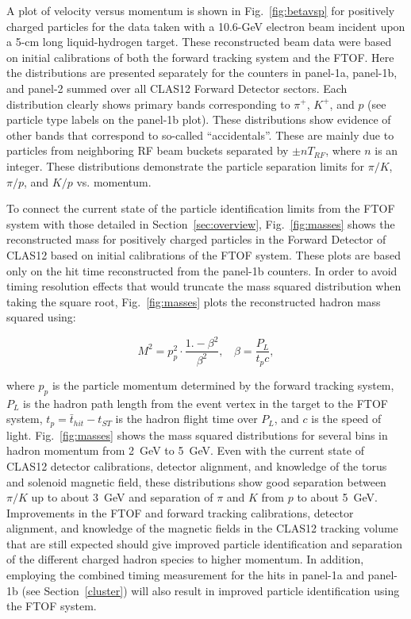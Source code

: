 \documentclass[3p,times,twocolumn]{elsarticle}
\begin{document}
A plot of velocity versus momentum is shown in Fig.~\ref{fig:betavsp} for positively charged particles
for the data taken with a 10.6-GeV electron beam incident upon a 5-cm long liquid-hydrogen target.
These reconstructed beam data were based on initial calibrations of both the forward tracking system
and the FTOF. Here the distributions are presented separately for the counters in panel-1a, panel-1b,
and panel-2 summed over all CLAS12 Forward Detector sectors. Each distribution clearly shows primary
bands corresponding to $\pi^+$, $K^+$, and $p$ (see particle type labels on the panel-1b plot). These
distributions show evidence of other bands that correspond to so-called ``accidentals''. These are
mainly due to particles from neighboring RF beam buckets separated by $\pm n T_{RF}$, where $n$ is
an integer. These distributions demonstrate the particle separation limits for $\pi/K$, $\pi/p$, and $K/p$
vs. momentum.

To connect the current state of the particle identification limits from the FTOF system with those
detailed in Section~\ref{sec:overview}, Fig.~\ref{fig:masses} shows the reconstructed mass for positively
charged particles in the Forward Detector of CLAS12 based on initial calibrations of the FTOF system.
These plots are based only on the hit time reconstructed from the panel-1b counters. In order to avoid
timing resolution effects that would truncate the mass squared distribution when taking the square root,
Fig.~\ref{fig:masses} plots the reconstructed hadron mass squared using:

\begin{equation}
M^2 = p_p^2 \cdot \frac{1.-\beta^2}{\beta^2},~~~~\beta=\frac{P_L}{t_p c},
\end{equation}

\noindent
where $p_p$ is the particle momentum determined by the forward tracking system, $P_L$ is the hadron
path length from the event vertex in the target to the FTOF system, $t_p= \bar{t}_{hit} - t_{ST}$ is
the hadron flight time over $P_L$, and $c$ is the speed of light. Fig.~\ref{fig:masses} shows the mass
squared distributions for several bins in hadron momentum from 2~GeV to 5~GeV. Even with the current
state of CLAS12 detector calibrations, detector alignment, and knowledge of the torus and solenoid
magnetic field, these distributions show good separation between $\pi/K$ up to about 3~GeV and
separation of $\pi$ and $K$ from $p$ to about 5~GeV. Improvements in the FTOF and forward tracking
calibrations, detector alignment, and knowledge of the magnetic fields in the CLAS12 tracking volume
that are still expected should give improved particle identification and separation of the different charged
hadron species to higher momentum. In addition, employing the combined timing measurement for the hits in
panel-1a and panel-1b (see Section~\ref{cluster}) will also result in improved particle identification using the
FTOF system.
\end{document}
